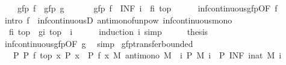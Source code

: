 \begin{isabellebody}
\ \ \ {\isachardoublequoteopen}{\isasymalpha}\ {\isacharparenleft}gfp\ f{\isacharparenright}\ {\isacharequal}\ gfp\ g{\isachardoublequoteclose}\isanewline
%
\isadelimproof
%
\endisadelimproof
%
\isatagproof
{}\isamarkupfalse%
\ {\isacharminus}\isanewline
\ \ \isamarkupfalse%
\ {\isachardoublequoteopen}{\isasymalpha}\ {\isacharparenleft}gfp\ f{\isacharparenright}\ {\isacharequal}\ {\isacharparenleft}INF\ i{\isachardot}\ {\isasymalpha}\ {\isacharparenleft}{\isacharparenleft}f{\isacharcircum}{\isacharcircum}i{\isacharparenright}\ top{\isacharparenright}{\isacharparenright}{\isachardoublequoteclose}\isanewline
\ \ \ \ \isamarkupfalse%
\ inf{\isacharunderscore}continuous{\isacharunderscore}gfp{\isacharbrackleft}OF\ f{\isacharbrackright}\ \isamarkupfalse%
\ {\isacharparenleft}intro\ f\ {\isasymalpha}\ inf{\isacharunderscore}continuousD\ antimono{\isacharunderscore}funpow\ inf{\isacharunderscore}continuous{\isacharunderscore}mono{\isacharparenright}\isanewline
\ \ \isamarkupfalse%
\ \isamarkupfalse%
\ {\isachardoublequoteopen}{\isasymalpha}\ {\isacharparenleft}{\isacharparenleft}f{\isacharcircum}{\isacharcircum}i{\isacharparenright}\ top{\isacharparenright}\ {\isacharequal}\ {\isacharparenleft}g{\isacharcircum}{\isacharcircum}i{\isacharparenright}\ top{\isachardoublequoteclose}\ \ i\isanewline
\ \ \ \ \isamarkupfalse%
\ {\isacharparenleft}induction\ i{\isacharsemicolon}\ simp{\isacharparenright}\isanewline
\ \ \isamarkupfalse%
\ \isamarkupfalse%
\ {\isacharquery}thesis\isanewline
\ \ \ \ \isamarkupfalse%
\ inf{\isacharunderscore}continuous{\isacharunderscore}gfp{\isacharbrackleft}OF\ g{\isacharbrackright}\ \isamarkupfalse%
\ simp\isanewline
{}\isamarkupfalse%
%
\endisatagproof
{\isafoldproof}%
%
\isadelimproof
\isanewline
%
\endisadelimproof
\isanewline
{}\isamarkupfalse%
\ gfp{\isacharunderscore}transfer{\isacharunderscore}bounded{\isacharcolon}\isanewline
\ \ \ P{\isacharcolon}\ {\isachardoublequoteopen}P\ {\isacharparenleft}f\ top{\isacharparenright}{\isachardoublequoteclose}\ {\isachardoublequoteopen}{\isasymAnd}x{\isachardot}\ P\ x\ {\isasymLongrightarrow}\ P\ {\isacharparenleft}f\ x{\isacharparenright}{\isachardoublequoteclose}\ {\isachardoublequoteopen}{\isasymAnd}M{\isachardot}\ antimono\ M\ {\isasymLongrightarrow}\ {\isacharparenleft}{\isasymAnd}i{\isachardot}\ P\ {\isacharparenleft}M\ i{\isacharparenright}{\isacharparenright}\ {\isasymLongrightarrow}\ P\ {\isacharparenleft}INF\ i{\isacharcolon}{\isacharcolon}nat{\isachardot}\ M\ i{\isacharparenright}{\isachardoublequoteclose}\isanewline

\end{isabellebody}
